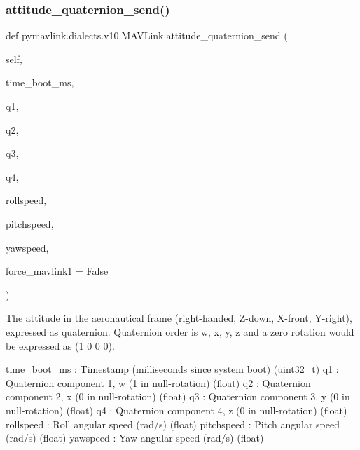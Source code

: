\subsubsection{\texorpdfstring{attitude\+\_\+quaternion\+\_\+send()}{attitude\_quaternion\_send()}}
{\footnotesize\ttfamily def pymavlink.\+dialects.\+v10.\+M\+A\+V\+Link.\+attitude\+\_\+quaternion\+\_\+send (\begin{DoxyParamCaption}\item[{}]{self,  }\item[{}]{time\+\_\+boot\+\_\+ms,  }\item[{}]{q1,  }\item[{}]{q2,  }\item[{}]{q3,  }\item[{}]{q4,  }\item[{}]{rollspeed,  }\item[{}]{pitchspeed,  }\item[{}]{yawspeed,  }\item[{}]{force\+\_\+mavlink1 = {\ttfamily False} }\end{DoxyParamCaption})}

\begin{DoxyVerb}The attitude in the aeronautical frame (right-handed, Z-down, X-front,
Y-right), expressed as quaternion. Quaternion order is
w, x, y, z and a zero rotation would be expressed as
(1 0 0 0).

time_boot_ms              : Timestamp (milliseconds since system boot) (uint32_t)
q1                        : Quaternion component 1, w (1 in null-rotation) (float)
q2                        : Quaternion component 2, x (0 in null-rotation) (float)
q3                        : Quaternion component 3, y (0 in null-rotation) (float)
q4                        : Quaternion component 4, z (0 in null-rotation) (float)
rollspeed                 : Roll angular speed (rad/s) (float)
pitchspeed                : Pitch angular speed (rad/s) (float)
yawspeed                  : Yaw angular speed (rad/s) (float)\end{DoxyVerb}
 \mbox{\label{classpymavlink_1_1dialects_1_1v10_1_1MAVLink_a8ca74919a63838a29eedc74a1ad830b5}} 
